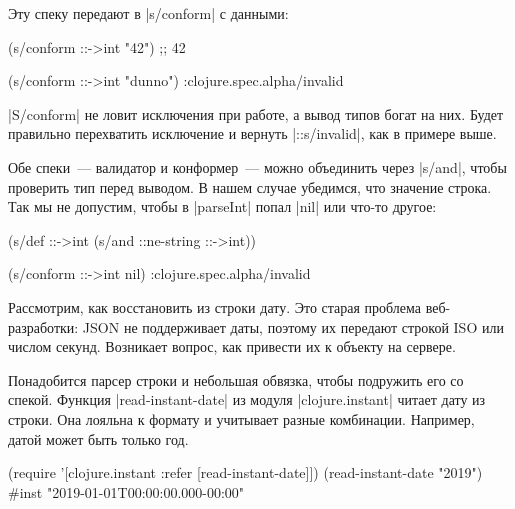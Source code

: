 \noindent
Эту спеку передают в \spverb|s/conform| с данными:

\begin{english}
  \begin{clojure}
(s/conform ::->int "42") ;; 42

(s/conform ::->int "dunno")
:clojure.spec.alpha/invalid
  \end{clojure}
\end{english}


\spverb|S/conform| не ловит исключения при работе, а вывод типов богат на
них. Будет правильно перехватить исключение и вернуть \spverb|::s/invalid|, как
в примере выше.

Обе спеки~--- валидатор и конформер~--- можно объединить через \spverb|s/and|,
чтобы проверить тип перед выводом. В нашем случае убедимся, что значение
строка. Так мы не допустим, чтобы в \spverb|parseInt| попал \spverb|nil| или
что-то другое:

\begin{english}
  \begin{clojure}
(s/def ::->int
  (s/and ::ne-string ::->int))

(s/conform ::->int nil)
:clojure.spec.alpha/invalid
  \end{clojure}
\end{english}


Рассмотрим, как восстановить из строки дату. Это старая проблема веб-разработки:
JSON не поддерживает даты, поэтому их передают строкой ISO или числом
секунд. Возникает вопрос, как привести их к объекту на сервере.


Понадобится парсер строки и небольшая обвязка, чтобы подружить его со
спекой. Функция \spverb|read-instant-date| из модуля \spverb|clojure.instant|
читает дату из строки. Она лояльна к формату и учитывает разные
комбинации. Например, датой может быть только год.


\begin{english}
  \begin{clojure}
(require '[clojure.instant :refer [read-instant-date]])
(read-instant-date "2019")
#inst "2019-01-01T00:00:00.000-00:00"
  \end{clojure}
\end{english}

